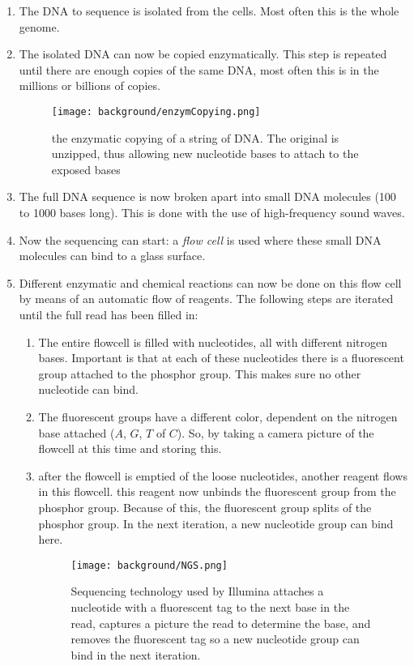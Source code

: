 \begin{enumerate}
	\item The DNA to sequence is isolated from the cells. Most often this is the whole genome.
	\item The isolated DNA can now be copied enzymatically. This step is repeated until there are enough copies of the same DNA, most often this is in the millions or billions of copies.
	
	\begin{figure}[!ht]
		\centering
		\texttt{[image: background/enzymCopying.png]}
		\caption{the enzymatic copying of a string of DNA. The original is unzipped, thus allowing new nucleotide bases to attach to the exposed bases}
		\label{fig:enzymCopying}
	\end{figure}
	
	\item The full DNA sequence is now broken apart into small DNA molecules (100 to 1000 bases long). This is done with the use of high-frequency sound waves.
	\item Now the sequencing can start: a \emph{flow cell} is used where these small DNA molecules can bind to a glass surface. 
	\item Different enzymatic and chemical reactions can now be done on this flow cell by means of an automatic flow of reagents. The following steps are iterated until the full read has been filled in:
	\begin{enumerate}
		\item The entire flowcell is filled with nucleotides, all with different nitrogen bases. Important is that at each of these nucleotides there is a fluorescent group attached to the phosphor group. This makes sure no other nucleotide can bind.
		\item The fluorescent groups have a different color, dependent on the nitrogen base attached ($A$, $G$, $T$ of $C$). So, by taking a camera picture of the flowcell at this time and storing this.
		\item after the flowcell is emptied of the loose nucleotides, another reagent flows in this flowcell. this reagent now unbinds the fluorescent group from the phosphor group. Because of this, the fluorescent group splits of the phosphor group. In the next iteration, a new nucleotide group can bind here.
		
		\begin{figure}[!ht]
			\centering
			\texttt{[image: background/NGS.png]}
			\caption{Sequencing technology used by Illumina attaches a nucleotide with a fluorescent tag to the next base in the read, captures a picture the read to determine the base, and removes the fluorescent tag so a new nucleotide group can bind in the next iteration.}
			\label{fig:NGS}
		\end{figure}
	\end{enumerate}


\end{enumerate}
